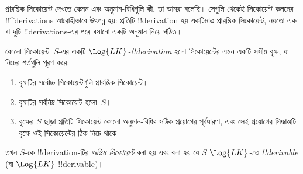 \documentclass[../../../include/open-logic-section]{subfiles}
\begin{document}
      {}
      {}


\begin{explain}
প্রারম্ভিক সিকোয়েন্ট দেখতে কেমন এবং অনুমান-বিধিগুলি কী, তা আমরা বলেছি।
সেগুলি থেকেই সিকোয়েন্ট কলনের !!^{derivation}s আরোহীভাবে উৎপন্ন হয়:
প্রতিটি !!{derivation} হয় একটিমাত্র প্রারম্ভিক সিকোয়েন্ট, নয়তো এক বা
দুটি !!{derivation}s-এর পরে বসানো একটি অনুমান নিয়ে গঠিত।
\end{explain}

\begin{defn}
কোনো সিকোয়েন্ট~$S$-এর একটি \emph{$\Log{LK}$-!!{derivation}} হলো
সিকোয়েন্টের এমন একটি সসীম বৃক্ষ, যা নিচের শর্তগুলি পূরণ করে:
\begin{enumerate}
\item বৃক্ষটির সর্বোচ্চ সিকোয়েন্টগুলি প্রারম্ভিক সিকোয়েন্ট।
\item বৃক্ষটির সর্বনিম্ন সিকোয়েন্ট হলো~$S$।
\item বৃক্ষের $S$ ছাড়া প্রতিটি সিকোয়েন্ট কোনো অনুমান-বিধির সঠিক
  প্রয়োগের পূর্বধারণা, এবং সেই প্রয়োগের সিদ্ধান্তটি বৃক্ষে ওই
  সিকোয়েন্টের ঠিক নিচে থাকে।
\end{enumerate}
তখন $S$-কে !!{derivation}-টির \emph{অন্তিম সিকোয়েন্ট} বলা হয় এবং বলা
হয় যে $S$ \emph{$\Log{LK}$-তে !!{derivable}} (বা
$\Log{LK}$-!!{derivable})।
\end{defn}
\end{document}
